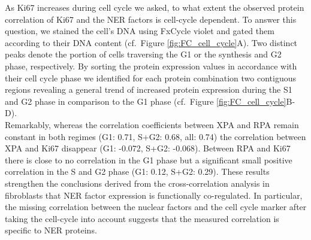 As Ki67 increases during cell cycle we asked, to what extent the observed protein correlation of Ki67 and the NER factors is cell-cycle dependent. To answer this question, we stained the cell's DNA using FxCycle violet and gated them according to their DNA content (cf.\ Figure \ref{fig:FC_cell_cycle}A). Two distinct peaks denote the portion of cells traversing the G1 or the synthesis and G2 phase, respectively. By sorting the protein expression values in accordance with their cell cycle phase we identified for each protein combination two contiguous regions revealing a general trend of increased protein expression during the S1 and G2 phase in comparison to the G1 phase (cf.\ Figure \ref{fig:FC_cell_cycle}B-D).\\
Remarkably, whereas the correlation coefficients between XPA and RPA remain constant in both regimes (G1: 0.71, S+G2: 0.68, all: 0.74) the correlation between XPA and Ki67 disappear (G1: -0.072, S+G2: -0.068). Between RPA and Ki67 there is close to no correlation in the G1 phase but a significant small positive correlation in the S and G2 phase (G1: 0.12, S+G2: 0.29). These results strengthen the conclusions derived from the cross-correlation analysis in fibroblasts that NER factor expression is functionally co-regulated. In particular, the missing correlation between the nuclear factors and the cell cycle marker after taking the cell-cycle into account suggests that the measured correlation is specific to NER proteins. 





